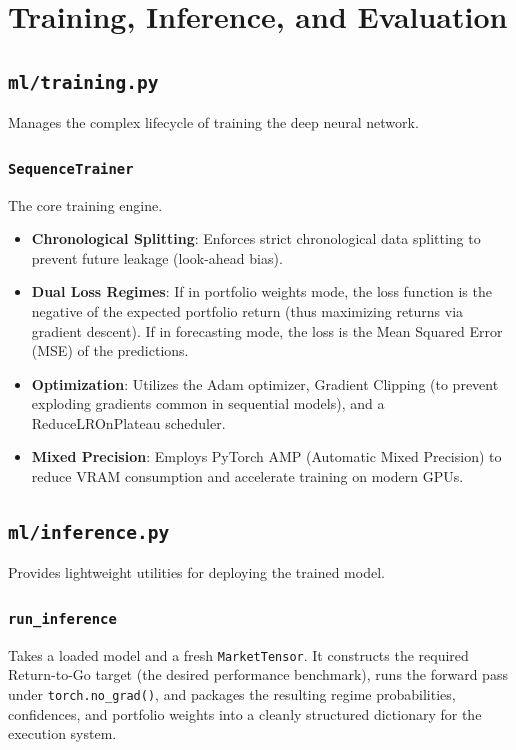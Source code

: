 \documentclass[12pt,a4paper]{report}
\begin{document}
\chapter{Training, Inference, and Evaluation}

\section{\texttt{ml/training.py}}
Manages the complex lifecycle of training the deep neural network.

\subsection{\texttt{SequenceTrainer}}
The core training engine. 
\begin{itemize}
    \item \textbf{Chronological Splitting}: Enforces strict chronological data splitting to prevent future leakage (look-ahead bias).
    \item \textbf{Dual Loss Regimes}: If in portfolio weights mode, the loss function is the negative of the expected portfolio return (thus maximizing returns via gradient descent). If in forecasting mode, the loss is the Mean Squared Error (MSE) of the predictions.
    \item \textbf{Optimization}: Utilizes the Adam optimizer, Gradient Clipping (to prevent exploding gradients common in sequential models), and a ReduceLROnPlateau scheduler.
    \item \textbf{Mixed Precision}: Employs PyTorch AMP (Automatic Mixed Precision) to reduce VRAM consumption and accelerate training on modern GPUs.
\end{itemize}

\section{\texttt{ml/inference.py}}
Provides lightweight utilities for deploying the trained model.

\subsection{\texttt{run\_inference}}
Takes a loaded model and a fresh \texttt{MarketTensor}. It constructs the required Return-to-Go target (the desired performance benchmark), runs the forward pass under \texttt{torch.no\_grad()}, and packages the resulting regime probabilities, confidences, and portfolio weights into a cleanly structured dictionary for the execution system.
\end{document}
